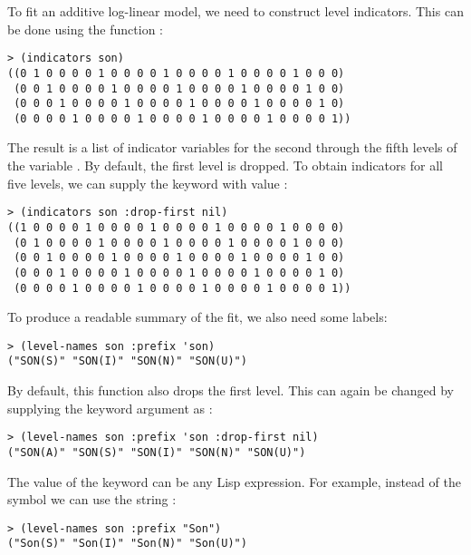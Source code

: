 To fit an additive log-linear model, we need to construct level
indicators.  This can be done using the function :
\begin{verbatim}
> (indicators son)
((0 1 0 0 0 0 1 0 0 0 0 1 0 0 0 0 1 0 0 0 0 1 0 0 0)
 (0 0 1 0 0 0 0 1 0 0 0 0 1 0 0 0 0 1 0 0 0 0 1 0 0)
 (0 0 0 1 0 0 0 0 1 0 0 0 0 1 0 0 0 0 1 0 0 0 0 1 0)
 (0 0 0 0 1 0 0 0 0 1 0 0 0 0 1 0 0 0 0 1 0 0 0 0 1))
\end{verbatim}
The result is a list of indicator variables for the second through the fifth
levels of the variable . By default, the first level is dropped.
To obtain indicators for all five levels, we can supply the 
keyword with value :
\begin{verbatim}
> (indicators son :drop-first nil)
((1 0 0 0 0 1 0 0 0 0 1 0 0 0 0 1 0 0 0 0 1 0 0 0 0)
 (0 1 0 0 0 0 1 0 0 0 0 1 0 0 0 0 1 0 0 0 0 1 0 0 0)
 (0 0 1 0 0 0 0 1 0 0 0 0 1 0 0 0 0 1 0 0 0 0 1 0 0)
 (0 0 0 1 0 0 0 0 1 0 0 0 0 1 0 0 0 0 1 0 0 0 0 1 0)
 (0 0 0 0 1 0 0 0 0 1 0 0 0 0 1 0 0 0 0 1 0 0 0 0 1))
\end{verbatim}

To produce a readable summary of the fit, we also need some labels:
\begin{verbatim}
> (level-names son :prefix 'son)
("SON(S)" "SON(I)" "SON(N)" "SON(U)")
\end{verbatim}
By default, this function also drops the first level. This can again be
changed by supplying the  keyword argument as
:
\begin{verbatim}
> (level-names son :prefix 'son :drop-first nil)
("SON(A)" "SON(S)" "SON(I)" "SON(N)" "SON(U)")
\end{verbatim}
The value of the  keyword can be any Lisp expression.
For example, instead of the symbol  we can use the string
:
\begin{verbatim}
> (level-names son :prefix "Son")
("Son(S)" "Son(I)" "Son(N)" "Son(U)")
\end{verbatim}

